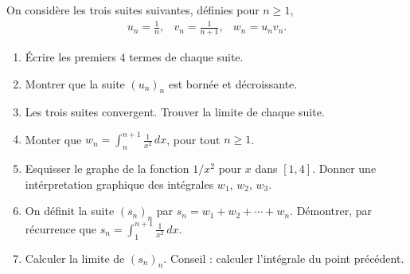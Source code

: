 
\begin{exercice}\label{exoExamenDecembre2010-0003}

On considère les trois suites suivantes, définies pour $n\geq 1$, 
\begin{equation}\nonumber
  \begin{array}{ccc}
   \displaystyle  u_n=\frac{1}{n}, &\displaystyle  v_n=\frac{1}{n+1}, & \displaystyle w_n=u_nv_n.
  \end{array}
\end{equation}
\begin{enumerate}
\item Écrire les premiers 4 termes de chaque suite.
\item Montrer que la suite $(u_n)_n$ est bornée et décroissante.  
\item Les trois suites convergent. Trouver la limite de chaque suite.
\item Monter que $\displaystyle w_n=\int_{n}^{n+1}\frac{1}{x^2}\, dx$, pour tout $n\geq 1$.
\item Esquisser le graphe de la fonction $1/x^2$ pour $x$ dans $[1,4]$. Donner une intérpretation graphique des intégrales  $w_1$, $w_2$, $w_3$. 
\item On définit la suite $(s_n)_n$ par $s_n= w_1+w_2+\cdots+ w_n$. Démontrer, par récurrence que $s_n=\int_{1}^{n+1}\frac{1}{x^2}\,dx$.
\item Calculer la limite de $(s_n)_n$. Conseil : calculer l'intégrale du point précédent.  
\end{enumerate}

\end{exercice}
